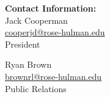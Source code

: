 \begin{minipage}[t]{0.95\linewidth}
\textbf{Contact Information:}\\
Jack Cooperman \\
\href{mailto:cooperjd@rose-hulman.edu}{cooperjd@rose-hulman.edu} \\
President

Ryan Brown \\
\href{mailto:brownrl@rose-hulman.edu}{brownrl@rose-hulman.edu} \\
Public Relations
\end{minipage}